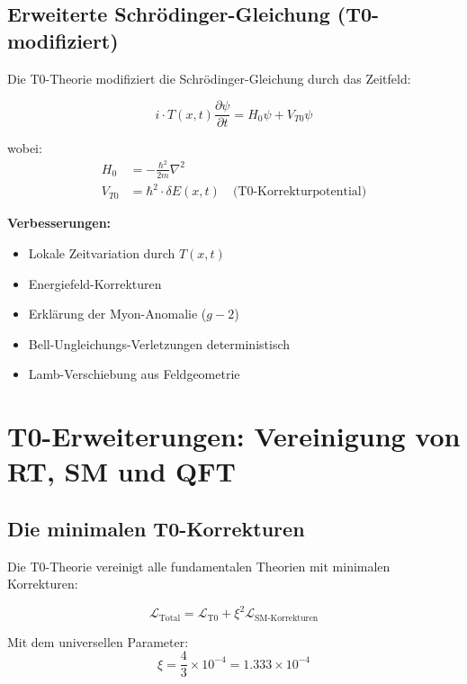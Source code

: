 	\subsection{Erweiterte Schrödinger-Gleichung (T0-modifiziert)}
	
	Die T0-Theorie modifiziert die Schrödinger-Gleichung durch das Zeitfeld:
	
	\begin{t0box}
		\begin{equation}
			i \cdot T(x,t) \frac{\partial\psi}{\partial t} = H_0 \psi + V_{T0} \psi
		\end{equation}
		
		wobei:
		\begin{align}
			H_0 &= -\frac{\hbar^2}{2m} \nabla^2 \\
			V_{T0} &= \hbar^2 \cdot \delta E(x,t) \quad \text{(T0-Korrekturpotential)}
		\end{align}
	\end{t0box}
	
	\textbf{Verbesserungen:}
	\begin{itemize}
		\item Lokale Zeitvariation durch $T(x,t)$
		\item Energiefeld-Korrekturen
		\item Erklärung der Myon-Anomalie ($g-2$)
		\item Bell-Ungleichungs-Verletzungen deterministisch
		\item Lamb-Verschiebung aus Feldgeometrie
	\end{itemize}
	
	\section{T0-Erweiterungen: Vereinigung von RT, SM und QFT}
	
	\subsection{Die minimalen T0-Korrekturen}
	
	Die T0-Theorie vereinigt alle fundamentalen Theorien mit minimalen Korrekturen:
	
	\begin{t0box}[T0-Vereinheitlichung]
		\begin{equation}
			\mathcal{L}_{\text{Total}} = \mathcal{L}_{\text{T0}} + \xi^2 \mathcal{L}_{\text{SM-Korrekturen}}
		\end{equation}
		
		Mit dem universellen Parameter:
		\begin{equation}
			\xi = \frac{4}{3} \times 10^{-4} = 1.333 \times 10^{-4}
		\end{equation}
	\end{t0box}
	
